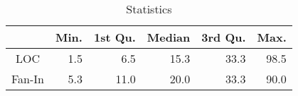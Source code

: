 \begin{table}[tb]
  \caption{Statistics}
  \label{tab:statistic}
  \centering

  \begin{tabular}{c|rrrrr}
  \hline
        & \textbf{Min.} & \textbf{1st Qu.} & \textbf{Median} & \textbf{3rd Qu.} & \textbf{Max.} \\
  \hline
   LOC  & 1.5 &   6.5 &  15.3  &   33.3 &   98.5 \\
Fan-In  & 5.3 &  11.0 &  20.0  &   33.3 &   90.0 \\
  \hline
  \end{tabular}
\end{table}





